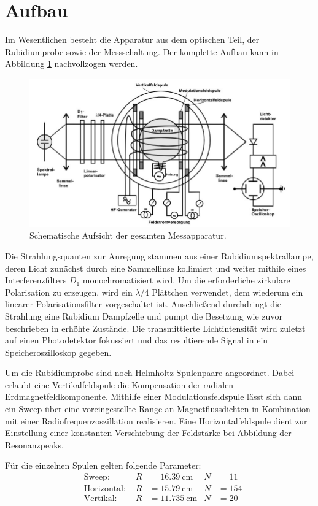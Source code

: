 \section{Aufbau}
\label{sec:Aufbau}

Im Wesentlichen besteht die Apparatur aus dem optischen Teil, der Rubidiumprobe sowie der Messschaltung. Der komplette Aufbau
kann in Abbildung \ref{fig:aufbau} nachvollzogen werden.

\begin{figure}[H]
	\centering
	\includegraphics[width=0.8\linewidth]{content/grafik/aufbau.jpg}
	\caption{Schematische Aufsicht der gesamten Messapparatur. \cite{pumpen}}
	\label{fig:aufbau}
\end{figure}

Die Strahlungsquanten zur Anregung stammen aus einer Rubidiumspektrallampe, deren Licht zunächst durch eine Sammellinse kollimiert
und weiter mithile eines Interferenzfilters $D_1$ monochromatisiert wird. Um die erforderliche zirkulare Polarisation zu
erzeugen, wird ein $\lambda/4$ Plättchen verwendet, dem wiederum ein linearer Polarisationsfilter vorgeschaltet ist. Anschließend
durchdringt die Strahlung eine Rubidium Dampfzelle und pumpt die Besetzung wie zuvor beschrieben in erhöhte Zustände. Die
transmittierte Lichtintensität wird zuletzt auf einen Photodetektor fokussiert und das resultierende Signal in ein
Speicheroszilloskop gegeben. 

Um die Rubidiumprobe sind noch Helmholtz Spulenpaare angeordnet. Dabei erlaubt eine Vertikalfeldspule die Kompensation
der radialen Erdmagnetfeldkomponente. Mithilfe einer Modulationsfeldspule lässt sich dann ein Sweep über eine voreingestellte
Range an Magnetflussdichten in Kombination mit einer Radiofrequenzoszillation realisieren. Eine Horizontalfeldspule dient zur
Einstellung einer konstanten Verschiebung der Feldstärke bei Abbildung der Resonanzpeaks. 

Für die einzelnen Spulen gelten folgende Parameter:
\begin{align*}
	&& && && && &\text{Sweep: } & R &= \qty{16.39}{\centi\meter} & N &= \num{11} && && && && \\
	&& && && && &\text{Horizontal: } & R &= \qty{15.79}{\centi\meter} & N &= \num{154} && && && && \\
	&& && && && &\text{Vertikal: } & R &= \qty{11.735}{\centi\meter} & N &= \num{20} && && && &&
\end{align*}
